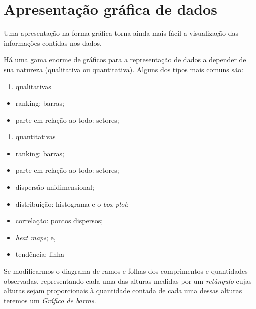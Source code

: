 \documentclass[
]{book}
\providecommand{\tightlist}{%
  \setlength{\itemsep}{0pt}\setlength{\parskip}{0pt}}
\begin{document}
\hypertarget{apresentauxe7uxe3o-gruxe1fica-de-dados}{%
\section{Apresentação gráfica de dados}\label{apresentauxe7uxe3o-gruxe1fica-de-dados}}

\hfill\break

Uma apresentação na forma gráfica torna ainda mais fácil a visualização das informações contidas nos dados.

\hfill\break

Há uma gama enorme de gráficos para a representação de dados a depender de sua natureza (qualitativa ou quantitativa). Alguns dos tipos mais comuns são:

\hfill\break

\begin{enumerate}
\def\labelenumi{\arabic{enumi}.}
\tightlist
\item
  qualitativas
\end{enumerate}

\hfill\break

\begin{itemize}
\tightlist
\item
  ranking: barras;
\item
  parte em relação ao todo: setores;
\end{itemize}

\begin{enumerate}
\def\labelenumi{\arabic{enumi}.}
\setcounter{enumi}{1}
\tightlist
\item
  quantitativas
\end{enumerate}

\hfill\break

\begin{itemize}
\tightlist
\item
  ranking: barras;
\item
  parte em relação ao todo: setores;
\item
  dispersão unidimensional;
\item
  distribuição: histograma e o \emph{box plot};
\item
  correlação: pontos dispersos;
\item
  \emph{heat maps}; e,
\item
  tendência: linha
\end{itemize}

\hfill\break

Se modificarmos o diagrama de ramos e folhas dos comprimentos e quantidades observadas, representando cada uma das alturas medidas por um \emph{retângulo} cujas alturas sejam proporcionais à quantidade contada de cada uma dessas alturas teremos um \emph{Gráfico de barras}.
\end{document}
